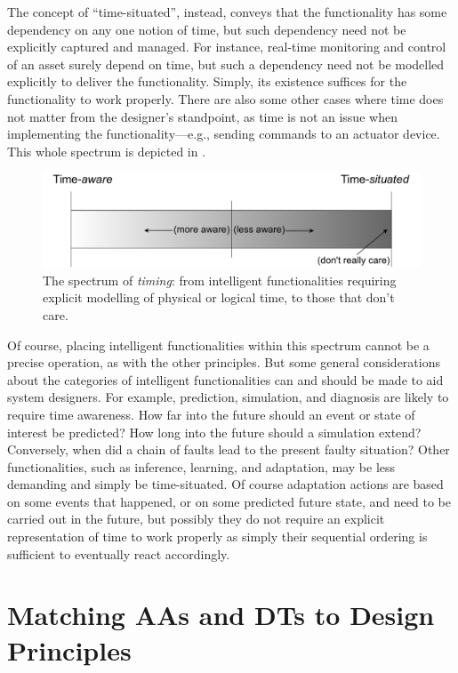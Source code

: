 The concept of ``time-situated'', instead, conveys that the functionality has some dependency on any one notion of time, but such dependency need not be explicitly captured and managed. 
For instance, real-time monitoring and control of an asset surely depend on time, but such a dependency need not be modelled explicitly to deliver the functionality. 
%
Simply, its existence suffices for the functionality to work properly.
There are also some other cases where time does not matter from the designer's standpoint, as time is not an issue when implementing the functionality---e.g., sending commands to an actuator device. 
This whole spectrum is depicted in . 

\begin{figure}
    \centering
    \includegraphics[width=.6\columnwidth]{figures/dt-mas/timing-spectrum.pdf}
    \caption{The spectrum of \emph{timing}: from intelligent functionalities requiring explicit modelling of physical or logical time, to those that don't care.}
    \label{fig:timing}
\end{figure}

Of course, placing intelligent functionalities within this spectrum cannot be a precise operation, as with the other principles. 
But some general considerations about the categories of intelligent functionalities can and should be made to aid system designers. 
%
For example, prediction, simulation, and diagnosis are likely to require time awareness. 
How far into the future should an event or state of interest be predicted? 
How long into the future should a simulation extend? 
Conversely, when did a chain of faults lead to the present faulty situation? 
%
Other functionalities, such as inference, learning, and adaptation, may be less demanding and simply be time-situated. 
Of course adaptation actions are based on some events that happened, or on some predicted future state, and need to be carried out in the future, but possibly they do not require an explicit representation of time to work properly as simply their sequential ordering is sufficient to eventually react accordingly. 

\section{Matching AAs and DTs to Design Principles}

